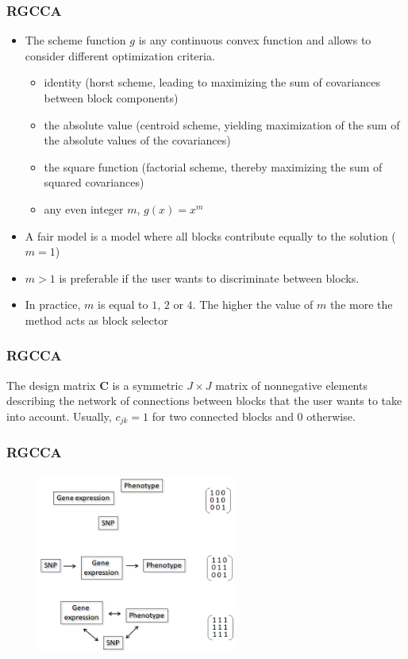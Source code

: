 \documentclass[10pt,xcolor=dvipsnames]{beamer}\usepackage[]{graphicx}\usepackage[]{color}
\newcommand{\ma}[1]{\ensuremath{\mathbf{#1}}}
\begin{document}
\begin{frame}[plain]\frametitle{RGCCA}

\begin{itemize}
 \item The scheme function $g$ is any continuous convex function and allows to consider different optimization criteria.  
  \begin{itemize}
   \item identity (horst scheme, leading to maximizing the sum of covariances between block components)
   \item the absolute value (centroid scheme, yielding maximization of the sum of the absolute values of the covariances)
   \item the square function (factorial scheme, thereby maximizing the sum of squared covariances)
   \item any even integer $m$, $g(x) = x^m$  
  \end{itemize} 
  \item A fair model is a model where all blocks contribute equally to the solution ($m=1$)
  \item $m>1$ is preferable if the user wants to discriminate between blocks. 
  \item In practice, $m$ is equal to $1$, $2$ or $4$. The higher the value of $m$ the more the method acts as block selector
\end{itemize}

\end{frame}


\begin{frame}[plain]\frametitle{RGCCA}

The design matrix $\ma C$ is a symmetric  $J \times J$ matrix of nonnegative elements describing the network of connections between blocks that the user wants to take into account. Usually, $c_{jk}=1$ for two connected blocks and 0 otherwise.

\end{frame}

\begin{frame}[plain]\frametitle{RGCCA}


\begin{figure}
\begin{center}
 \includegraphics[height=6cm, width=6.5cm]{figures/rgcca.png}
\end{center}
\end{figure}
\end{frame}
\end{document}
